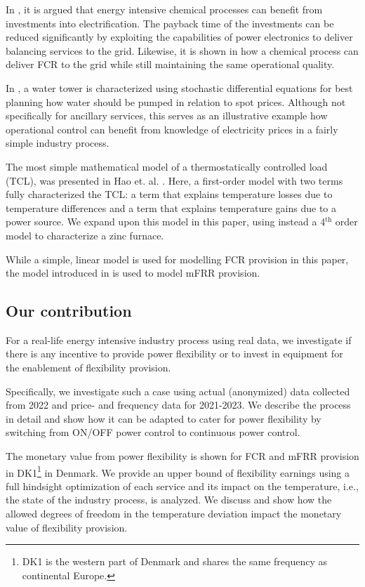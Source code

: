 \documentclass[sigconf]{acmart}
\begin{document}
In \cite{mallapragada2023decarbonization}, it is argued that energy intensive chemical processes can benefit from investments into electrification. The payback time of the investments can be reduced significantly by exploiting the capabilities of power electronics to deliver balancing services to the grid. Likewise, it is shown in \cite{samani2022flexible} how a chemical process can deliver FCR to the grid while still maintaining the same operational quality.

In \cite{junker2020stochastic}, a water tower is characterized using stochastic differential equations for best planning how water should be pumped in relation to spot prices. Although not specifically for ancillary services, this serves as an illustrative example how operational control can benefit from knowledge of electricity prices in a fairly simple industry process.

The most simple mathematical model of a thermostatically controlled load (TCL), was presented in Hao et. al. \cite{hao2014aggregate}. Here, a first-order model with two terms fully characterized the TCL: a term that explains temperature losses due to temperature differences and a term that explains temperature gains due to a power source. We expand upon this model in this paper, using instead a 4$^{\text{th}}$ order model to characterize a zinc furnace.

While a simple, linear model is used for modelling FCR provision in this paper, the model introduced in \cite{gade2023load} is used to model mFRR provision.



\subsection{Our contribution}

For a real-life energy intensive industry process using real data, we investigate if there is any incentive to provide power flexibility or to invest in equipment for the enablement of flexibility provision.

Specifically, we investigate such a case using actual (anonymized) data collected from 2022 and price- and frequency data for 2021-2023. We describe the process in detail and show how it can be adapted to cater for power flexibility by switching from ON/OFF power control to continuous power control.

The monetary value from power flexibility is shown for FCR and mFRR provision in DK1\footnote{DK1 is the western part of Denmark and shares the same frequency as continental Europe.} in Denmark. We provide an upper bound of flexibility earnings using a full hindsight optimization of each service and its impact on the temperature, i.e., the state of the industry process, is analyzed. We discuss and show how the allowed degrees of freedom in the temperature deviation impact the monetary value of flexibility provision.
\end{document}
